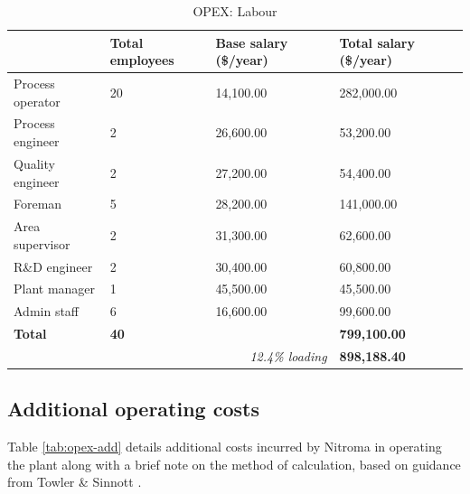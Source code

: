 \begin{table}[H]
\centering
\caption{OPEX: Labour}
\label{tab:opex-labour}
\begin{tabular}{llll}
\toprule
\textbf{}        & \textbf{Total employees} & \textbf{Base salary (\$/year)}              & \textbf{Total salary (\$/year)} \\\midrule
Process operator & 20                       & 14,100.00                                   & 282,000.00                      \\
Process engineer & 2                        & 26,600.00                                   & 53,200.00                       \\
Quality engineer & 2                        & 27,200.00                                   & 54,400.00                       \\
Foreman          & 5                        & 28,200.00                                   & 141,000.00                      \\
Area supervisor  & 2                        & 31,300.00                                   & 62,600.00                       \\
R\&D engineer    & 2                        & 30,400.00                                   & 60,800.00                       \\
Plant manager    & 1                        & 45,500.00                                   & 45,500.00                       \\
Admin staff      & 6                        & 16,600.00                                   & 99,600.00                       \\
\textbf{Total}   & \textbf{40}              & \textbf{}                                   & \textbf{799,100.00}             \\
                 &                          & \multicolumn{1}{r}{\textit{12.4\% loading}} & \textbf{898,188.40} \\\bottomrule           
\end{tabular}
\end{table}

\subsection{Additional operating costs}
Table \ref{tab:opex-add} details additional costs incurred by Nitroma in operating the plant along with a brief note on the method of calculation, based on guidance from Towler \& Sinnott \cite{sinnott_chemical_2020}.

